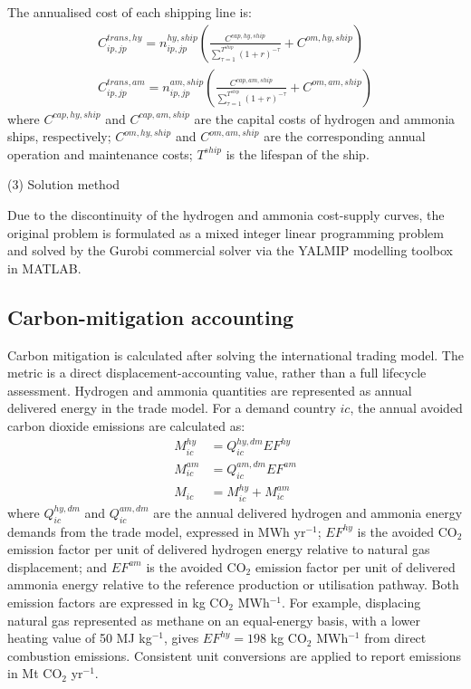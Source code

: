 \documentclass[sn-mathphys,Numbered]{sn-jnl}%
\theoremstyle{plain}%
\theoremstyle{definition}%
\theoremstyle{remark}%
\begin{document}
The annualised cost of each shipping line is:
\begin{align}
    C_{ip,jp}^{trans,hy} =  n_{ip,jp}^{hy,ship} \left( \frac{C^{cap,hy,ship}}{\sum_{\tau = 1}^{T^{ship}} (1+r)^{-\tau}} + C^{om,hy,ship} \right)
    \\
    C_{ip,jp}^{trans,am} =  n_{ip,jp}^{am,ship} \left( \frac{C^{cap,am,ship}}{\sum_{\tau = 1}^{T^{ship}} (1+r)^{-\tau}} + C^{om,am,ship} \right)
\end{align}
where $C^{cap,hy,ship}$ and $C^{cap,am,ship}$ are the capital costs of hydrogen and ammonia ships, respectively; $C^{om,hy,ship}$ and $C^{om,am,ship}$ are the corresponding annual operation and maintenance costs; $T^{ship}$ is the lifespan of the ship.

(3) Solution method

Due to the discontinuity of the hydrogen and ammonia cost-supply curves, the original problem is formulated as a mixed integer linear programming problem and solved by the Gurobi \cite{Gurobi} commercial solver via the YALMIP modelling toolbox in MATLAB.

\subsection{Carbon-mitigation accounting}

Carbon mitigation is calculated after solving the international trading model. The metric is a direct displacement-accounting value, rather than a full lifecycle assessment. Hydrogen and ammonia quantities are represented as annual delivered energy in the trade model. For a demand country $ic$, the annual avoided carbon dioxide emissions are calculated as:
\begin{align}
    M_{ic}^{hy} &=
    Q_{ic}^{hy,dm} EF^{hy}
    \\
    M_{ic}^{am} &=
    Q_{ic}^{am,dm} EF^{am}
    \\
    M_{ic} &= M_{ic}^{hy} + M_{ic}^{am}
\end{align}
where $Q_{ic}^{hy,dm}$ and $Q_{ic}^{am,dm}$ are the annual delivered hydrogen and ammonia energy demands from the trade model, expressed in MWh yr$^{-1}$; $EF^{hy}$ is the avoided CO$_2$ emission factor per unit of delivered hydrogen energy relative to natural gas displacement; and $EF^{am}$ is the avoided CO$_2$ emission factor per unit of delivered ammonia energy relative to the reference production or utilisation pathway. Both emission factors are expressed in kg CO$_2$ MWh$^{-1}$. For example, displacing natural gas represented as methane on an equal-energy basis, with a lower heating value of 50 MJ kg$^{-1}$, gives $EF^{hy}=198$ kg CO$_2$ MWh$^{-1}$ from direct combustion emissions. Consistent unit conversions are applied to report emissions in Mt CO$_2$ yr$^{-1}$.
\end{document}
